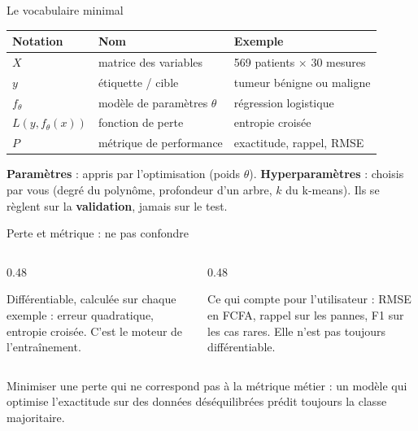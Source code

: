 \begin{frame}{Le vocabulaire minimal}
\begin{center}
\small
\begin{tabular}{@{}lll@{}}
\toprule
\textbf{Notation} & \textbf{Nom} & \textbf{Exemple} \\
\midrule
$X$ & matrice des variables & 569 patients $\times$ 30 mesures \\
$y$ & étiquette / cible & tumeur bénigne ou maligne \\
$f_\theta$ & modèle de paramètres $\theta$ & régression logistique \\
$L(y, f_\theta(x))$ & fonction de perte & entropie croisée \\
$P$ & métrique de performance & exactitude, rappel, RMSE \\
\bottomrule
\end{tabular}
\end{center}
\vspace{1.5mm}
\begin{kbox}
\textbf{Paramètres} : appris par l'optimisation (poids $\theta$).
\textbf{Hyperparamètres} : choisis par vous (degré du polynôme, profondeur
d'un arbre, $k$ du k-means). Ils se règlent sur la \textbf{validation}, jamais
sur le test.
\end{kbox}
\end{frame}

\begin{frame}{Perte et métrique : ne pas confondre}
\begin{columns}[t]
\begin{column}{0.48\textwidth}
\begin{ebox}
Différentiable, calculée sur chaque exemple : erreur quadratique,
entropie croisée. C'est le moteur de l'entraînement.
\end{ebox}
\end{column}
\begin{column}{0.48\textwidth}
\begin{ebox}
Ce qui compte pour l'utilisateur : RMSE en FCFA, rappel sur les pannes,
F1 sur les cas rares. Elle n'est pas toujours différentiable.
\end{ebox}
\end{column}
\end{columns}
\vspace{2mm}
\begin{wbox}
Minimiser une perte qui ne correspond pas à la métrique métier : un modèle
qui optimise l'exactitude sur des données déséquilibrées prédit toujours
la classe majoritaire.
\end{wbox}
\end{frame}

